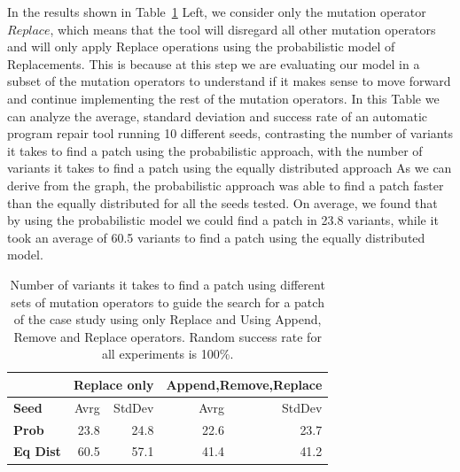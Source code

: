 \documentclass[conference]{IEEEtran}
\begin{document}
In the results shown in Table~\ref{fig:resultsReplace} Left, we consider only the mutation operator 
$Replace$, which means that the tool will disregard all other mutation 
operators and will only apply Replace operations using the probabilistic model 
of Replacements. This is because at this step we are evaluating our model in a 
subset of the mutation operators to understand if it makes sense to move forward and 
continue implementing the rest of the mutation operators.
%
In this Table we can analyze the average, standard deviation and success rate of an automatic program repair tool running 10 different seeds, contrasting the 
number of variants it takes to find a patch using the probabilistic approach, with the number of variants it takes to find a patch using the 
equally distributed approach 
%
As we can derive from the graph, the probabilistic approach was able to find a 
patch faster than the equally distributed for all the seeds tested. On average,
we found that by using the probabilistic model we  
could find a patch in 23.8 variants, while it took an average of 60.5 variants 
to find a patch using the equally distributed model.

\begin{table}[ht]
\begin{tabular}{l|rr|rr}
  & \multicolumn{2}{|c|}{Replace only} & \multicolumn{2}{c}{Append,Remove,Replace} \\
\hline
\textbf{Seed}& Avrg & StdDev & Avrg & StdDev\\
\hline
\textbf{Prob} & 23.8 & 24.8  & 22.6 & 23.7  \\

\textbf{Eq Dist} & 60.5 & 57.1 & 41.4 & 41.2 \\
\hline
\end{tabular}
\\
\\
\center
  \caption{Number of variants it takes to find a patch using different sets of
    mutation operators to guide the search for a patch of the case study using
    only Replace and Using Append, Remove and Replace operators. Random success
    rate for all experiments is 100\%. }
  \label{fig:resultsReplace}
\end{table} 

\end{document}
